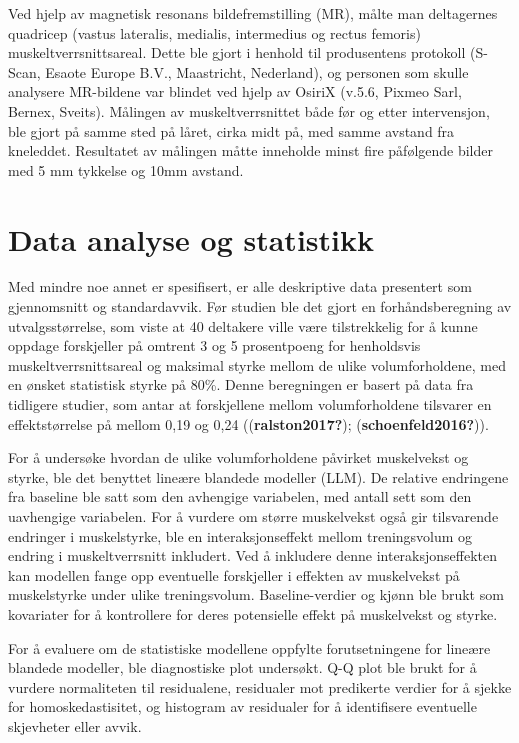 \documentclass[
  letterpaper,
  DIV=11,
  numbers=noendperiod]{scrreprt}
\begin{document}
Ved hjelp av magnetisk resonans bildefremstilling (MR), målte man
deltagernes quadricep (vastus lateralis, medialis, intermedius og rectus
femoris) muskeltverrsnittsareal. Dette ble gjort i henhold til
produsentens protokoll (S-Scan, Esaote Europe B.V., Maastricht,
Nederland), og personen som skulle analysere MR-bildene var blindet ved
hjelp av OsiriX (v.5.6, Pixmeo Sarl, Bernex, Sveits). Målingen av
muskeltverrsnittet både før og etter intervensjon, ble gjort på samme
sted på låret, cirka midt på, med samme avstand fra kneleddet.
Resultatet av målingen måtte inneholde minst fire påfølgende bilder med
5 mm tykkelse og 10mm avstand.

\section{Data analyse og statistikk}\label{data-analyse-og-statistikk}

Med mindre noe annet er spesifisert, er alle deskriptive data presentert
som gjennomsnitt og standardavvik. Før studien ble det gjort en
forhåndsberegning av utvalgsstørrelse, som viste at 40 deltakere ville
være tilstrekkelig for å kunne oppdage forskjeller på omtrent 3 og 5
prosentpoeng for henholdsvis muskeltverrsnittsareal og maksimal styrke
mellom de ulike volumforholdene, med en ønsket statistisk styrke på
80\%. Denne beregningen er basert på data fra tidligere studier, som
antar at forskjellene mellom volumforholdene tilsvarer en
effektstørrelse på mellom 0,19 og 0,24 ((\textbf{ralston2017?});
(\textbf{schoenfeld2016?})).

For å undersøke hvordan de ulike volumforholdene påvirket muskelvekst og
styrke, ble det benyttet lineære blandede modeller (LLM). De relative
endringene fra baseline ble satt som den avhengige variabelen, med
antall sett som den uavhengige variabelen. For å vurdere om større
muskelvekst også gir tilsvarende endringer i muskelstyrke, ble en
interaksjonseffekt mellom treningsvolum og endring i muskeltverrsnitt
inkludert. Ved å inkludere denne interaksjonseffekten kan modellen fange
opp eventuelle forskjeller i effekten av muskelvekst på muskelstyrke
under ulike treningsvolum. Baseline-verdier og kjønn ble brukt som
kovariater for å kontrollere for deres potensielle effekt på muskelvekst
og styrke.

For å evaluere om de statistiske modellene oppfylte forutsetningene for
lineære blandede modeller, ble diagnostiske plot undersøkt. Q-Q plot ble
brukt for å vurdere normaliteten til residualene, residualer mot
predikerte verdier for å sjekke for homoskedastisitet, og histogram av
residualer for å identifisere eventuelle skjevheter eller avvik.
\end{document}
